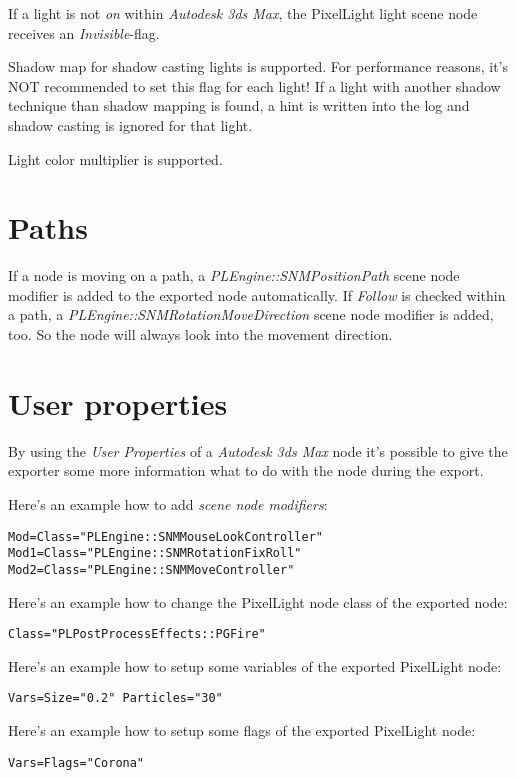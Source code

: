 If a light is not \emph{on} within \emph{Autodesk 3ds Max}, the PixelLight light scene node receives an \emph{Invisible}-flag.

Shadow map for shadow casting lights is supported. For performance reasons, it's NOT recommended to set this flag for each light! If a light with another shadow technique than shadow mapping is found, a hint is written into the log and shadow casting is ignored for that light.

Light color multiplier is supported.




\section{Paths}
If a node is moving on a path, a \emph{PLEngine::SNMPositionPath} scene node modifier is added to the exported node automatically. If \emph{Follow} is checked within a path, a \emph{PLEngine::SNMRotationMoveDirection} scene node modifier is added, too. So the node will always look into the movement direction.





\section{User properties}
By using the \emph{User Properties} of a \emph{Autodesk 3ds Max} node it's possible to give the exporter some more information what to do with the node during the export.

Here's an example how to add \emph{scene node modifiers}:

\begin{lstlisting}[caption=Multiple scene node modifiers]
Mod=Class="PLEngine::SNMMouseLookController"
Mod1=Class="PLEngine::SNMRotationFixRoll"
Mod2=Class="PLEngine::SNMMoveController"
\end{lstlisting}

Here's an example how to change the PixelLight node class of the exported node:

\begin{lstlisting}[caption=Setting the scene node class]
Class="PLPostProcessEffects::PGFire"
\end{lstlisting}

Here's an example how to setup some variables of the exported PixelLight node:

\begin{lstlisting}[caption=Setting scene node variables]
Vars=Size="0.2" Particles="30"
\end{lstlisting}

Here's an example how to setup some flags of the exported PixelLight node:

\begin{lstlisting}[caption=Setting scene node flags]
Vars=Flags="Corona"
\end{lstlisting}
